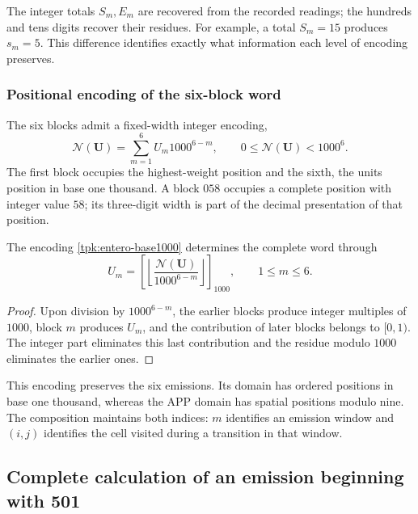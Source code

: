 The integer totals \(S_m,E_m\) are recovered from the recorded readings;
the hundreds and tens digits recover their residues. For example, a total
\(S_m=15\) produces \(s_m=5\). This difference identifies exactly
what information each level of encoding preserves.

\subsubsection{Positional encoding of the six-block word}

The six blocks admit a fixed-width integer encoding,
\begin{equation}
 \mathscr N(\mathbf U)=\sum_{m=1}^{6}U_m1000^{6-m},
 \qquad0\leq\mathscr N(\mathbf U)<1000^6.
 \label{tpk:entero-base1000}
\end{equation}
The first block occupies the highest-weight position and the sixth, the units
position in base one thousand. A block \(058\) occupies a complete position with integer
value \(58\); its three-digit width is part of the decimal
presentation of that position.

\begin{proposicion}
\label{tpk:inversa-base1000}
The encoding \eqref{tpk:entero-base1000} determines the complete word
through
\[
 U_m=\left[\left\lfloor
 \frac{\mathscr N(\mathbf U)}{1000^{6-m}}\right\rfloor\right]_{1000},
 \qquad1\leq m\leq6.
\]
\end{proposicion}
\begin{proof}
Upon division by \(1000^{6-m}\), the earlier blocks produce integer
multiples of \(1000\), block \(m\) produces \(U_m\), and the contribution
of later blocks belongs to \([0,1)\). The integer part eliminates this
last contribution and the residue modulo \(1000\) eliminates the earlier ones.
\end{proof}

This encoding preserves the six emissions. Its domain has ordered
positions in base one thousand, whereas the APP domain has spatial positions
modulo nine. The composition maintains both indices: \(m\) identifies an
emission window and \((i,j)\) identifies the cell visited during a
transition in that window.

\subsection{Complete calculation of an emission beginning with 501}
\label{tpk:ejemplo501}

